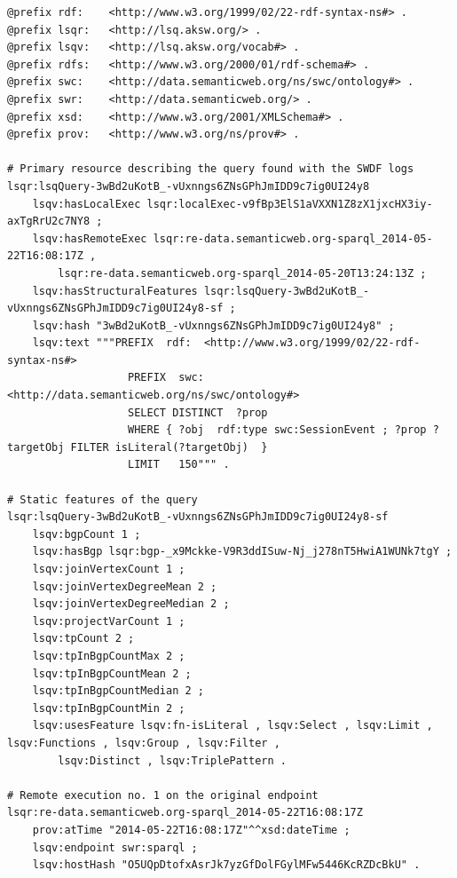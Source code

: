 
\begin{lstlisting}[caption = {An example LSQ/RDF representation of a SPARQL query in Turtle syntax},label = {lst:reprsentation},style=lst,basicstyle={\scriptsize\ttfamily},language=ttl,frame={single},breaklines=true,stepnumber=0,float=*]
@prefix rdf:	<http://www.w3.org/1999/02/22-rdf-syntax-ns#> .
@prefix lsqr:	<http://lsq.aksw.org/> .
@prefix lsqv:	<http://lsq.aksw.org/vocab#> .
@prefix rdfs:	<http://www.w3.org/2000/01/rdf-schema#> .
@prefix swc:	<http://data.semanticweb.org/ns/swc/ontology#> .
@prefix swr:	<http://data.semanticweb.org/> .
@prefix xsd:	<http://www.w3.org/2001/XMLSchema#> .
@prefix prov:	<http://www.w3.org/ns/prov#> .

# Primary resource describing the query found with the SWDF logs
lsqr:lsqQuery-3wBd2uKotB_-vUxnngs6ZNsGPhJmIDD9c7ig0UI24y8	
	lsqv:hasLocalExec lsqr:localExec-v9fBp3ElS1aVXXN1Z8zX1jxcHX3iy-axTgRrU2c7NY8 ;
	lsqv:hasRemoteExec lsqr:re-data.semanticweb.org-sparql_2014-05-22T16:08:17Z ,
		lsqr:re-data.semanticweb.org-sparql_2014-05-20T13:24:13Z ;
	lsqv:hasStructuralFeatures lsqr:lsqQuery-3wBd2uKotB_-vUxnngs6ZNsGPhJmIDD9c7ig0UI24y8-sf ;
	lsqv:hash "3wBd2uKotB_-vUxnngs6ZNsGPhJmIDD9c7ig0UI24y8" ;
	lsqv:text """PREFIX  rdf:  <http://www.w3.org/1999/02/22-rdf-syntax-ns#>
	               PREFIX  swc:  <http://data.semanticweb.org/ns/swc/ontology#>
	               SELECT DISTINCT  ?prop
	               WHERE { ?obj  rdf:type swc:SessionEvent ; ?prop ?targetObj FILTER isLiteral(?targetObj)  }
	               LIMIT   150""" .

# Static features of the query
lsqr:lsqQuery-3wBd2uKotB_-vUxnngs6ZNsGPhJmIDD9c7ig0UI24y8-sf	
	lsqv:bgpCount 1 ;
	lsqv:hasBgp lsqr:bgp-_x9Mckke-V9R3ddISuw-Nj_j278nT5HwiA1WUNk7tgY ;
	lsqv:joinVertexCount 1 ;
	lsqv:joinVertexDegreeMean 2 ;
	lsqv:joinVertexDegreeMedian 2 ;
	lsqv:projectVarCount 1 ;
	lsqv:tpCount 2 ;
	lsqv:tpInBgpCountMax 2 ;
	lsqv:tpInBgpCountMean 2 ;
	lsqv:tpInBgpCountMedian 2 ;
	lsqv:tpInBgpCountMin 2 ;
	lsqv:usesFeature lsqv:fn-isLiteral , lsqv:Select , lsqv:Limit , lsqv:Functions , lsqv:Group , lsqv:Filter , 
		lsqv:Distinct , lsqv:TriplePattern .              

# Remote execution no. 1 on the original endpoint
lsqr:re-data.semanticweb.org-sparql_2014-05-22T16:08:17Z	
	prov:atTime "2014-05-22T16:08:17Z"^^xsd:dateTime ;
	lsqv:endpoint swr:sparql ;
	lsqv:hostHash "O5UQpDtofxAsrJk7yzGfDolFGylMFw5446KcRZDcBkU" .


\end{lstlisting}
